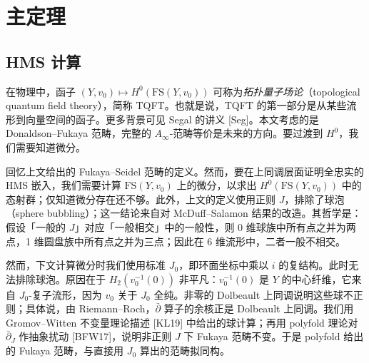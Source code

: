 \section{主定理}

\subsection{HMS 计算}

\begin{remark}\label{rem:tqft}
在物理中，函子 $(Y,v_0)\mapsto H^0(\mathrm{FS}(Y,v_0))$ 可称为\emph{拓扑量子场论}（topological quantum field theory），简称 TQFT。也就是说，TQFT 的第一部分是从某些流形到向量空间的函子。更多背景可见 Segal 的讲义 [Seg]。本文考虑的是 Donaldson--Fukaya 范畴，完整的 $A_\infty$-范畴等价是未来的方向。要过渡到 $H^0$，我们需要知道微分。
\end{remark}

\begin{remark}\label{rem:diff}
回忆上文给出的 Fukaya--Seidel 范畴的定义。然而，要在上同调层面证明全忠实的 HMS 嵌入，我们需要计算 $\mathrm{FS}(Y,v_0)$ 上的微分，以求出 $H^0(\mathrm{FS}(Y,v_0))$ 中的态射群；仅知道微分存在还不够。此外，上文的定义使用正则 $J$，排除了球泡（sphere bubbling）；这一结论来自对 McDuff--Salamon 结果的改造。其哲学是：假设「一般的 $J$」对应「一般相交」中的一般性，则 0 维球族中所有点之并为两点，1 维圆盘族中所有点之并为三点；因此在 6 维流形中，二者一般不相交。
\end{remark}

然而，下文计算微分时我们使用标准 $J_0$，即环面坐标中乘以 $i$ 的复结构。此时无法排除球泡。原因在于 $H_2(v_0^{-1}(0))$ 非平凡：$v_0^{-1}(0)$ 是 $Y$ 的中心纤维，它来自 $J_0$-复子流形，因为 $v_0$ 关于 $J_0$ 全纯。非零的 Dolbeault 上同调说明这些球不正则；具体说，由 Riemann--Roch，$\bar\partial$ 算子的余核正是 Dolbeault 上同调。我们用 Gromov--Witten 不变量理论描述 [KL19] 中给出的球计算；再用 polyfold 理论对 $\bar\partial_J$ 作抽象扰动 [BFW17]，说明非正则 $J$ 下 Fukaya 范畴不变。于是 polyfold 给出的 Fukaya 范畴，与直接用 $J_0$ 算出的范畴拟同构。


